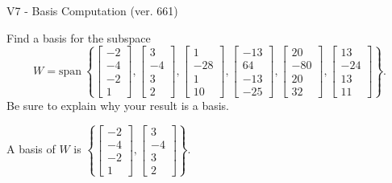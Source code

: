 \begin{exercise}
  \begin{exerciseTitle}V7 - Basis Computation (ver. 661)\end{exerciseTitle}
  \begin{exerciseStatement}
    Find a basis for the subspace 
\[W=\mathrm{span}\ \left\{\left[\begin{array}{r}
-2 \\
-4 \\
-2 \\
1
\end{array}\right] , \left[\begin{array}{r}
3 \\
-4 \\
3 \\
2
\end{array}\right] , \left[\begin{array}{r}
1 \\
-28 \\
1 \\
10
\end{array}\right] , \left[\begin{array}{r}
-13 \\
64 \\
-13 \\
-25
\end{array}\right] , \left[\begin{array}{r}
20 \\
-80 \\
20 \\
32
\end{array}\right] , \left[\begin{array}{r}
13 \\
-24 \\
13 \\
11
\end{array}\right]\right\}.\]
 Be sure to explain why your result is a basis.


  \end{exerciseStatement}
  \begin{exerciseAnswer}
   A basis of \(W\) is  \(\left\{\left[\begin{array}{r}
-2 \\
-4 \\
-2 \\
1
\end{array}\right] , \left[\begin{array}{r}
3 \\
-4 \\
3 \\
2
\end{array}\right]\right\}\).
  


  \end{exerciseAnswer}
\end{exercise}